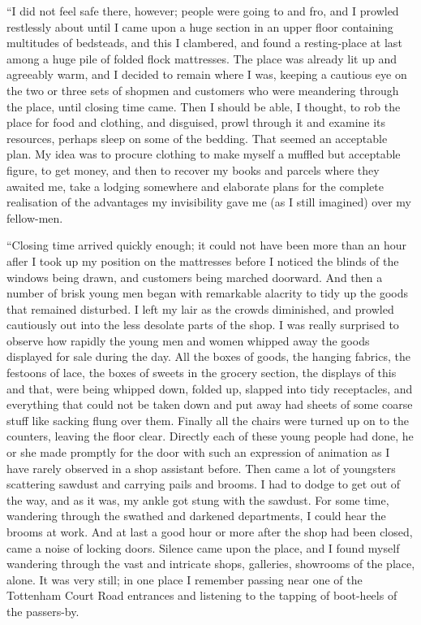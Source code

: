 “I did not feel safe there, however; people were going to and fro, and I prowled restlessly about until I came upon a huge section in an upper floor containing multitudes of bedsteads, and this I clambered, and found a resting-place at last among a huge pile of folded flock mattresses. The place was already lit up and agreeably warm, and I decided to remain where I was, keeping a cautious eye on the two or three sets of shopmen and customers who were meandering through the place, until closing time came. Then I should be able, I thought, to rob the place for food and clothing, and disguised, prowl through it and examine its resources, perhaps sleep on some of the bedding. That seemed an acceptable plan. My idea was to procure clothing to make myself a muffled but acceptable figure, to get money, and then to recover my books and parcels where they awaited me, take a lodging somewhere and elaborate plans for the complete realisation of the advantages my invisibility gave me (as I still imagined) over my fellow-men.

“Closing time arrived quickly enough; it could not have been more than an hour afler I took up my position on the mattresses before I noticed the blinds of the windows being drawn, and customers being marched doorward. And then a number of brisk young men began with remarkable alacrity to tidy up the goods that remained disturbed. I left my lair as the crowds diminished, and prowled cautiously out into the less desolate parts of the shop. I was really surprised to observe how rapidly the young men and women whipped away the goods displayed for sale during the day. All the boxes of goods, the hanging fabrics, the festoons of lace, the boxes of sweets in the grocery section, the displays of this and that, were being whipped down, folded up, slapped into tidy receptacles, and everything that could not be taken down and put away had sheets of some coarse stuff like sacking flung over them. Finally all the chairs were turned up on to the counters, leaving the floor clear. Directly each of these young people had done, he or she made promptly for the door with such an expression of animation as I have rarely observed in a shop assistant before. Then came a lot of youngsters scattering sawdust and carrying pails and brooms. I had to dodge to get out of the way, and as it was, my ankle got stung with the sawdust. For some time, wandering through the swathed and darkened departments, I could hear the brooms at work. And at last a good hour or more after the shop had been closed, came a noise of locking doors. Silence came upon the place, and I found myself wandering through the vast and intricate shops, galleries, showrooms of the place, alone. It was very still; in one place I remember passing near one of the Tottenham Court Road entrances and listening to the tapping of boot-heels of the passers-by.

